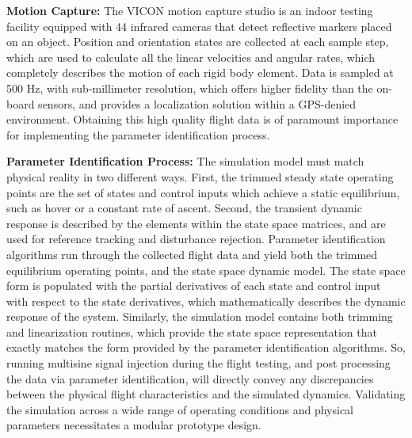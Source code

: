 \documentclass[11pt]{article}
\begin{document}
{\color{green} \bf Motion Capture:}
The VICON motion capture studio is an indoor testing facility equipped with 44 infrared cameras that detect reflective markers placed on an object.  Position and orientation states are collected at each sample step, which are used to calculate all the linear velocities and angular rates, which completely describes the motion of each rigid body element.  Data is sampled at 500 Hz, with sub-millimeter resolution, which offers higher fidelity than the on-board sensors, and provides a localization solution within a GPS-denied environment.  Obtaining this high quality flight data is of paramount importance for implementing the parameter identification process.


{\color{green} \bf Parameter Identification Process:}
The simulation model must match physical reality in two different ways.  First, the trimmed steady state operating points are the set of states and control inputs which achieve a static equilibrium, such as hover or a constant rate of ascent.  Second, the transient dynamic response is described by the elements within the state space matrices, and are used for reference tracking and disturbance rejection.  Parameter identification algorithms run through the collected flight data and yield both the trimmed equilibrium operating points, and the state space dynamic model.  The state space form is populated with the partial derivatives of each state and control input with respect to the state derivatives, which mathematically describes the dynamic response of the system.  Similarly, the simulation model contains both trimming and linearization routines, which provide the state space representation that exactly matches the form provided by the parameter identification algorithms.  So, running multisine signal injection during the flight testing, and post processing the data via parameter identification, will directly convey any discrepancies between the physical flight characteristics and the simulated dynamics.  Validating the simulation across a wide range of operating conditions and physical parameters necessitates a modular prototype design.
\end{document}

